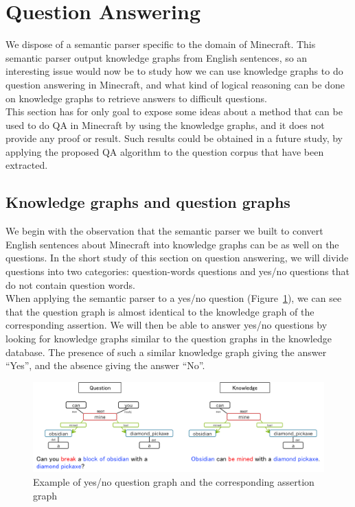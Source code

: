 \documentclass[12pt]{article}
\begin{document}
\newpage
\section{Question Answering}

We dispose of a semantic parser specific to the domain of Minecraft. This semantic parser output knowledge graphs from English sentences, so an interesting issue would now be to study how we can use knowledge graphs to do question answering in Minecraft, and what kind of logical reasoning can be done on knowledge graphs to retrieve answers to difficult questions.\\
This section has for only goal to expose some ideas about a method that can be used to do QA in Minecraft by using the knowledge graphs, and it does not provide any proof or result. Such results could be obtained in a future study, by applying the proposed QA algorithm to the question corpus that have been extracted.

\subsection{Knowledge graphs and question graphs}

We begin with the observation that the semantic parser we built to convert English sentences about Minecraft into knowledge graphs can be as well on the questions. In the short study of this section on question answering, we will divide questions into two categories: question-words questions and yes/no questions that do not contain question words.\\
When applying the semantic parser to a yes/no question (Figure~\ref{yesNoQuestion}), we can see that the question graph is almost identical to the knowledge graph of the corresponding assertion. We will then be able to answer yes/no questions by looking for knowledge graphs similar to the question graphs in the knowledge database. The presence of such a similar knowledge graph giving the answer ``Yes'', and the absence giving the answer ``No''.\\

\begin{figure}[!ht]
   \centering \includegraphics[width=\linewidth]{Figures/Question_Answering/yesNoQuestion.png}
   \caption{\label{yesNoQuestion} Example of yes/no question graph and the corresponding assertion graph}
\end{figure}
\end{document}

